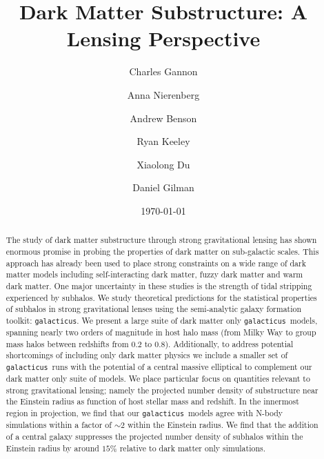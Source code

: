 \documentclass[%
 reprint,
 amsmath,
 amssymb,
 aps,
prd,
twocolumn,
superscriptaddress,
preprintnumbers,
floatfix,
nofootinbib
]{revtex4-2}
\def\gal{{\tt galacticus}~}
\def\galns{{\tt galacticus}}
\begin{document}

\title{Dark Matter Substructure: A Lensing Perspective}

\author{Charles Gannon}
\author{Anna Nierenberg}
\author{Andrew Benson}
\author{Ryan Keeley}
\author{Xiaolong Du}
\author{Daniel Gilman}



\date{\today}%

\begin{abstract}
The study of dark matter substructure through strong gravitational lensing has shown enormous promise in probing the properties of dark matter on sub-galactic scales.
This approach has already been used to place strong constraints on a wide range of dark matter models including self-interacting dark matter, fuzzy dark matter and warm dark matter.
One major uncertainty in these studies is the strength of tidal stripping experienced by subhalos.
We study theoretical predictions for the statistical properties of subhalos in strong gravitational lenses using the semi-analytic galaxy formation toolkit: \galns.
We present a large suite of dark matter only \gal models, spanning nearly two orders of magnitude in host halo mass (from Milky Way to group mass halos between redshifts from $0.2$ to $0.8$).
Additionally, to address potential shortcomings of including only dark matter physics we include a smaller set of \gal runs with the potential of a central massive elliptical to complement our dark matter only suite of models.
We place particular focus on quantities relevant to strong gravitational lensing; namely the projected number density of substructure near the Einstein radius as function of host stellar mass and redshift.
In the innermost region in projection, we find that our \gal models agree with N-body simulations within a factor of $\sim 2$ within the Einstein radius.
We find that the addition of a central galaxy suppresses the projected number density of subhalos within the Einstein radius by around $15\%$ relative to dark matter only simulations.

\end{abstract}
\end{document}
